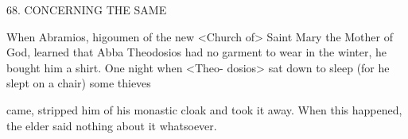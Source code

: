 68. CONCERNING THE SAME

When Abramios, higoumen of the new <Church of> Saint Mary the
Mother of God, learned that Abba Theodosios had no garment to
wear in the winter, he bought him a shirt. One night when <Theo-
dosios> sat down to sleep (for he slept on a chair) some thieves

came, stripped him of his monastic cloak and took it away. When
this happened, the elder said nothing about it whatsoever.
